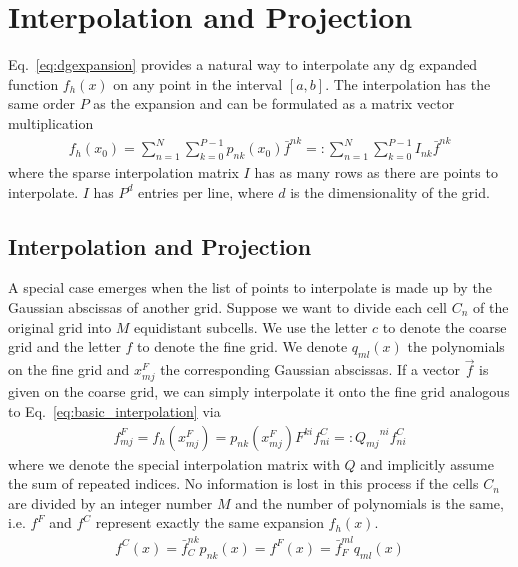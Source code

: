 \section{Interpolation and Projection}
Eq.~\eqref{eq:dgexpansion} provides a natural way to interpolate any
dg expanded function $f_h(x)$ on any point in the interval $[a,b]$.
The interpolation has the same order $P$ as the expansion and
can be formulated as a matrix vector multiplication
\begin{align}
f_h(x_0) = \sum_{n=1}^N\sum_{k=0}^{P-1} p_{nk}(x_0) \bar f^{nk} =: \sum_{n=1}^N\sum_{k=0}^{P-1}I_{nk} \bar f^{nk}
\label{eq:basic_interpolation}
\end{align}
where the sparse interpolation matrix $I$ has as many rows as there are
points to interpolate. $I$ has $P^d$ entries per line, where $d$ is the dimensionality of the grid.


\subsection{Interpolation and Projection}
A special case emerges when the list of points to interpolate is made up
by the Gaussian abscissas of another grid.
Suppose we want to divide each cell $C_n$ of the original grid into $M$ equidistant subcells.
We use the letter $c$ to denote the coarse grid and the letter $f$ to denote
the fine grid.
We denote $q_{ml}(x)$ the polynomials on the fine grid and $x^F_{mj}$ the
corresponding Gaussian abscissas.
If a vector $\vec f$ is given on the coarse grid, we can simply interpolate
it onto the fine grid analogous to Eq.~\eqref{eq:basic_interpolation} via
\begin{align}
  f^F_{mj} = f_h(x^F_{mj}) = p_{nk}(x^F_{mj})F^{ki} f^C_{ni}  =: {Q_{mj}}^{ni} f^C_{ni}
  \label{eq:interpolation}
\end{align}
where we denote the special interpolation matrix with $Q$ and implicitly assume the sum of repeated indices.
No information is lost in this process if the cells $C_n$ are divided by an
integer number $M$ and the number of polynomials is the same, i.e.
$f^F$ and $f^C$ represent exactly the same expansion $f_h(x)$.
\begin{align}
  f^C(x) = \bar f_C^{nk}p_{nk}(x) = f^F(x) = \bar f_F^{ml}q_{ml}(x) 
  \label{eq:no_loss}
\end{align}

